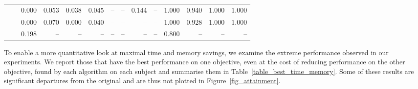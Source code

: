 \begin{table*}[htb]
{\begin{tabular}{|l|l|r|r|r|r|r|r|r|r|r|r|r|r|}
\multirow{2}{*}{\dr{}}              & \sn{}        & 0.000                     & 0.053                     & 0.038                     & 0.045                    & --                        & --                        & 0.144                     & --                       & 1.000                     & 0.940                     & 1.000                     & 1.000                    \\
                                   & \sr{}        & 0.000                     & 0.070                     & 0.000                     & 0.040                    & --                        & --                        & --                        & --                       & 1.000                     & 0.928                     & 1.000                     & 1.000                    \\ \hline
\multicolumn{1}{|c|}{\sn{}}         & \sr{}        & 0.198                     & --                        & --                        & --                       & --                        & --                        & --                        & --                       & 0.800                     & --                        & --                        & --                       \\ \hline
\end{tabular}
}
\vspace{-1.5em}
\end{table*}

To enable a more quantitative look at maximal time and memory savings, we
examine the extreme performance observed in our experiments. We report
those that have the best performance on
one objective, even at the cost of reducing performance on the other
objective, found by each
algorithm on each subject and summarise them in Table~\ref{table_best_time_memory}.
Some of these results are significant
departures from the original and are thus not plotted in Figure~\ref{fig_attainment}. 

